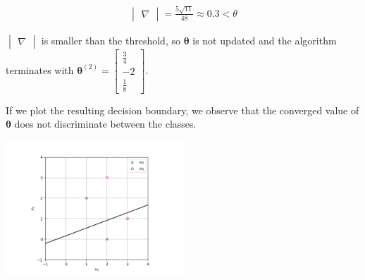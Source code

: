 \documentclass[a4paper, 10pt, twoside]{article}
\begin{document}
\begin{enumerate}[a)]
          \begin{align*}
              \begin{vmatrix}
                  \nabla
              \end{vmatrix} = \frac{5\sqrt{11}}{48} \approx 0.3 < \theta
          \end{align*}

          $\begin{vmatrix} \nabla \end{vmatrix}$ is smaller than the threshold, so $ \bm{\theta} $ is not updated and the algorithm terminates with $\bm{\theta}^{(2)} = \begin{bmatrix} \frac{3}{4} \\ -2 \\ \frac{1}{8} \end{bmatrix}$.

          If we plot the resulting decision boundary, we observe that the converged value of $\bm{\theta}$ does not discriminate between the classes.

          \begin{center}
              \includegraphics[width=0.5\textwidth]{graph4.png}
          \end{center}
\end{enumerate}
\end{document}

